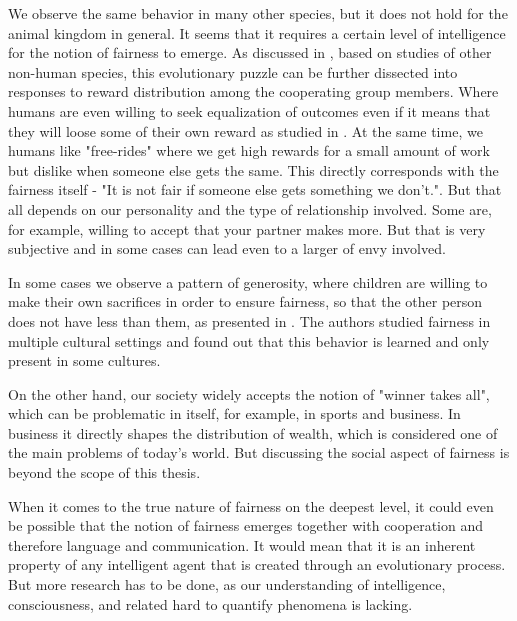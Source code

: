 We observe the same behavior in many other species, but it does not hold for the animal kingdom in general. It seems that it requires a certain level of intelligence for the notion of fairness to emerge. As discussed in \cite{brosnan2014evolution}, based on studies of other non-human species, this evolutionary puzzle can be further dissected into responses to reward distribution among the cooperating group members. Where humans are even willing to seek equalization of outcomes even if it means that they will loose some of their own reward as studied in \cite{willing_to_pay_to_equality}. At the same time, we humans like "free-rides" where we get high rewards for a small amount of work but dislike when someone else gets the same. This directly corresponds with the fairness itself - "It is not fair if someone else gets something we don't.". But that all depends on our personality and the type of relationship involved. Some are, for example, willing to accept that your partner makes more. But that is very subjective and in some cases can lead even to a larger of envy involved.


In some cases we observe a pattern of generosity, where children are willing to make their own sacrifices in order to ensure fairness, so that the other person does not have less than them, as presented in \cite{children_generocity_blake}. The authors studied fairness in multiple cultural settings and found out that this behavior is learned and only present in some cultures.

On the other hand, our society widely accepts the notion of "winner takes all", which can be problematic in itself, for example, in sports and business. In business it directly shapes the distribution of wealth, which is considered one of the main problems of today's world. But discussing the social aspect of fairness is beyond the scope of this thesis.


When it comes to the true nature of fairness on the deepest level, it could even be possible that the notion of fairness emerges together with cooperation and therefore language and communication. It would mean that it is an inherent property of any intelligent agent that is created through an evolutionary process. But more research has to be done, as our understanding of intelligence, consciousness, and related hard to quantify phenomena is lacking.\newline

